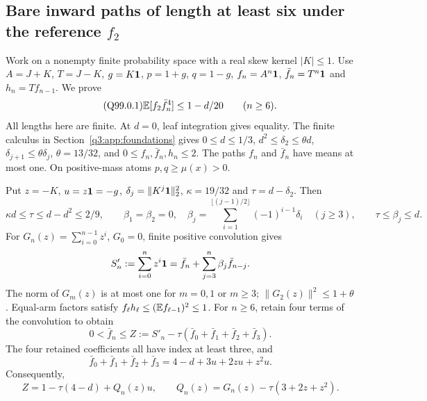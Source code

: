 \subsection{Bare inward paths of length at least six under the reference $f_2$}\label{proof:Q5-C099}
Work on a nonempty finite probability space with a real skew kernel
$|K|\le\allowbreak 1$. Use $A=\allowbreak J+K$, $T=\allowbreak J-K$, $g=\allowbreak K\mathbf1$, $p=\allowbreak 1+g$,
$q=\allowbreak 1-g$, $f_n=\allowbreak A^n\mathbf1$, $\bar f_n=\allowbreak T^n\mathbf1$ and
$h_n=\allowbreak Tf_{n-1}$. We prove
\begin{equation}\tag{Q99.0.1}\label{eq:Q99:bare}
 \mathbb E[f_2\bar f_n^4]\le1-d/20\qquad(n\ge6).
\end{equation}
All lengths here are finite. At $d=\allowbreak 0$, leaf integration gives equality.
The finite calculus in Section~\ref{q3:app:foundations} gives
$0\le\allowbreak  d\le\allowbreak 1/3$, $d^2\le\allowbreak \delta_2\le\allowbreak \theta d$,
$\delta_{j+1}\le\allowbreak \theta\delta_j$, $\theta=\allowbreak 13/32$,
and $0\le\allowbreak  f_n,\allowbreak \bar f_n,\allowbreak h_n\le\allowbreak 2$. The paths $f_n$ and $\bar f_n$ have means at most one.
On positive-mass atoms $p,\allowbreak q\ge\allowbreak \mu(x)>\allowbreak 0$.

Put $z=\allowbreak -K$, $u=\allowbreak z\mathbf1=\allowbreak -g$, $\delta_j=\allowbreak \|K^j\mathbf1\|_2^2$,
$\kappa=\allowbreak 19/32$ and $\tau=\allowbreak d-\delta_2$. Then
\[
 \kappa d\le\tau\le d-d^2\le2/9,\qquad
 \beta_1=\beta_2=0,\quad
 \beta_j=\sum_{i=1}^{\lfloor(j-1)/2\rfloor}(-1)^{i-1}\delta_i
 \quad(j\ge3),\qquad \tau\le\beta_j\le d.
\]
For $G_n(z)=\allowbreak \sum_{i=\allowbreak 0}^{n-1}z^i$, $G_0=\allowbreak 0$, finite positive
convolution gives
\[
 S'_n:=\sum_{i=0}^nz^i\mathbf1
 =\bar f_n+\sum_{j=3}^n\beta_j\bar f_{n-j}.
\]
The norm of $G_m(z)$ is at most one for $m=\allowbreak 0,\allowbreak 1$ or $m\ge\allowbreak 3$;
$\|G_2(z)\|^2\le\allowbreak 1+\theta$. Equal-arm factors satisfy
$f_\ell h_\ell\le\allowbreak (\mathbb E f_{\ell-1})^2\le\allowbreak 1$.
For $n\ge\allowbreak 6$, retain four terms of the convolution to obtain
\[
 0<\bar f_n\le Z:=S'_n-\tau(\bar f_0+\bar f_1+\bar f_2+\bar f_3).
\]
The four retained coefficients all have index at least three, and
\[
 \bar f_0+\bar f_1+\bar f_2+\bar f_3=4-d+3u+2zu+z^2u.
\]
Consequently,
\begin{equation}\tag{Q99.0.2}\label{eq:Q99:majorant}
 Z=1-\tau(4-d)+Q_n(z)u,\qquad
 Q_n(z)=G_n(z)-\tau(3+2z+z^2).
\end{equation}

